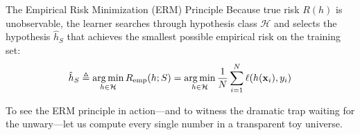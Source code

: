 \begin{theorembox}{The Empirical Risk Minimization (ERM) Principle}
Because true risk $R(h)$ is unobservable, the learner searches through hypothesis class $\mathcal{H}$ and selects the hypothesis $\hat{h}_S$ that achieves the smallest possible empirical risk on the training set:
\begin{equation}
\hat{h}_S \triangleq \operatorname*{arg\,min}_{h \in \mathcal{H}} R_{\text{emp}}(h; S) = \operatorname*{arg\,min}_{h \in \mathcal{H}} \frac{1}{N} \sum_{i=1}^N \ell(h(\mathbf{x}_i), y_i)
\label{eq:erm_formal_ped}
\end{equation}
\end{theorembox}

To see the ERM principle in action—and to witness the dramatic trap waiting for the unwary—let us compute every single number in a transparent toy universe.

